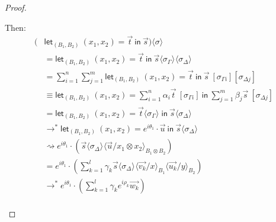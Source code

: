 \documentclass[runningheads,orivec,envcountsame,envcountsect]{llncs}
\newcommand\lra{\longrightarrow}
\newcommand\ansubst[2]{\ensuremath{\langle #1 \rangle_{#2}}}
\def\Pair#1#2{(#1,#2)} %
\def\letkeyword{\mathsf{let}}
\def\inkeyword{\mathsf{in}}
\def\LetP#1#2#3#4#5#6{\letkeyword_{\Pair{#2}{#4}}~\Pair{#1}{#3}=#5~\inkeyword~#6}
\def\lraneq{\rightsquigarrow}
\def\eval{\lra^*}
\begin{document}
\begin{proof}
\begin{description}
    Then:
    \begin{align*}
        (&\LetP{x_1}{B_1}{x_2}{B_2}{\vec{t}}{\vec{s}})\ansubst{\sigma}{} \\
        &= \LetP{x_1}{B_1}{x_2}{B_2}{\vec{t}}{\vec{s}}\ansubst{\sigma_\Gamma}{}\ansubst{\sigma_\Delta}{}\\
        &=\sum_{i=1}^{n}\sum_{j=1}^{m}\LetP{x_1}{B_1}{x_2}{B_2}{\vec{t}}{\vec{s}}\ [\sigma_{\Gamma i}][\sigma_{\Delta j}]\\
        &\equiv \LetP{x_1}{B_1}{x_2}{B_2}{\sum_{i=1}^{n}\alpha_i\vec{t}\ [\sigma_{\Gamma i}]}{\sum_{j=1}^{m}\beta_j \vec{s}\ [\sigma_{\Delta j}]}\\
        &=\LetP{x_1}{B_1}{x_2}{B_2}{\vec{t}\ansubst{\sigma_\Gamma}{}}{\vec{s}\ansubst{\sigma_\Delta}{}}\\
        &\eval\LetP{x_1}{B_1}{x_2}{B_2}{e^{i\theta_1}\cdot\vec{u}}{\vec{s}\ansubst{\sigma_\Delta}{}}\\
        &\lraneq e^{i\theta_1}\cdot(\vec{s}\ansubst{\sigma_\Delta}{}\ansubst{\vec{u}/x_1\otimes x_2}{B_1\otimes B_2})\\
        &=e^{i\theta_1}\cdot(\sum_{k=1}^{l}\gamma_k\vec{s}\ansubst{\sigma_\Delta}{}\ansubst{\vec{v_k}/x}{B_1}\ansubst{\vec{u_k}/y}{B_2})\\
        &\eval e^{i\theta_1}\cdot(\sum_{k=1}^{l}\gamma_k e^{i\rho_k} \vec{w_k})\\
    \end{align*}


\end{description}
\end{proof}
\end{document}
